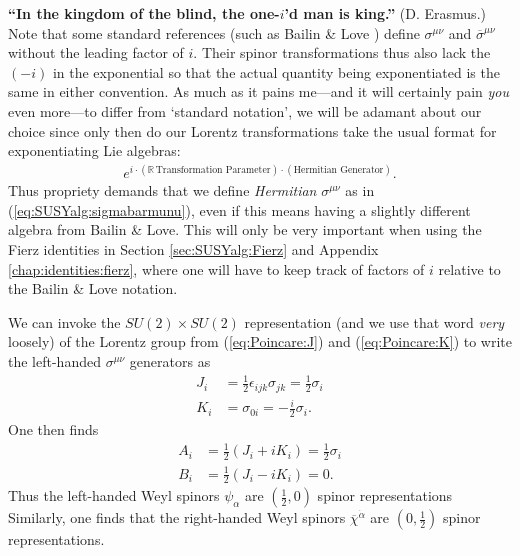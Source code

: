 \documentclass[12pt]{article}
\numberwithin{equation}{section}    %
\begin{document}
\vspace{.5em}
\begin{framed}
\noindent\textbf{``In the kingdom of the blind, the one-$i$'d man is king.''} (D. Erasmus.) Note that some standard references (such as Bailin \& Love \cite{Bailin:1994qt}) define $\sigma^{\mu\nu}$ and $\overline\sigma^{\mu\nu}$ without the leading factor of $i$. Their spinor transformations thus also lack the $(-i)$ in the exponential so that the actual quantity being exponentiated is the same in either convention. As much as it pains me---and it will certainly pain \textit{you} even more---to differ from `standard notation', we will be adamant about our choice since only then do our Lorentz transformations take the usual format for exponentiating Lie algebras:
	\begin{align}
		e^{i\cdot(\mathbb R\,\text{Transformation Parameter})\cdot(\text{Hermitian Generator})}.
	\end{align} 
Thus propriety demands that we define \textit{Hermitian} $\sigma^{\mu\nu}$ as in  (\ref{eq:SUSYalg:sigmabarmunu}), even if this means having a slightly different algebra from Bailin \& Love. This will only be very important when using the Fierz identities in Section \ref{sec:SUSYalg:Fierz} and Appendix  \ref{chap:identities:fierz}, where one will have to keep track of factors of $i$ relative to the Bailin \& Love notation.
\end{framed}
\vspace{.5em}

We can invoke the $SU(2)\times SU(2)$ representation (and we use that word \emph{very} loosely) of the Lorentz group from (\ref{eq:Poincare:J}) and (\ref{eq:Poincare:K}) to write the left-handed $\sigma^{\mu\nu}$ generators as
\begin{align}
	J_i &= \frac 12 \epsilon_{ijk}\sigma_{jk} = \frac 12 \sigma_i\label{eq:SUSYalg:Jpauli}\\
	K_i &= \sigma_{0i} = -\frac i2 \sigma_i.\label{eq:SUSYalg:Kpauli}
\end{align}
One then finds
\begin{align}
	A_i &= \frac 12 (J_i+iK_i) = \frac 12 \sigma_i\\
	B_i &= \frac 12 (J_i - iK_i) = 0.
\end{align}
Thus the left-handed Weyl spinors $\psi_\alpha$ are $(\frac 12, 0)$ spinor representations Similarly, one finds that the right-handed Weyl spinors $\overline \chi^{\dot\alpha}$ are $(0,\frac 12)$ spinor representations.
\end{document}
